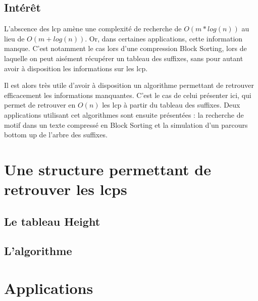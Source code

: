 \documentclass[a4paper,10pt]{article}
\begin{document}
\subsection{Intérêt}
\label{sec:interest}


L'abscence des lcp amène une complexité de recherche de $O(m*log(n))$
au lieu de $O(m+log(n))$. Or, dans certaines applications, cette
information manque. C'est notamment le cas lors d'une compression
Block Sorting, lors de laquelle on peut aisément récupérer un tableau
des suffixes, sans pour autant avoir à disposition les informations
sur les lcp.

Il est alors très utile d'avoir à disposition un algorithme permettant
de retrouver efficacement les informations manquantes. C'est le cas de
celui présenter ici, qui permet de retrouver en $O(n)$ les lcp à
partir du tableau des suffixes. Deux applications utilisant cet
algorithmes sont ensuite présentées : la recherche de motif dans un
texte compressé en Block Sorting et la simulation d'un parcours bottom
up de l'arbre des suffixes.


\section{Une structure permettant de retrouver les lcps}
\label{sec:heightstruct}


\subsection{Le tableau Height}
\label{sec:struct}




\subsection{L'algorithme}
\label{sec:algo}



\section{Applications}
\label{sec:appli}
\end{document}
